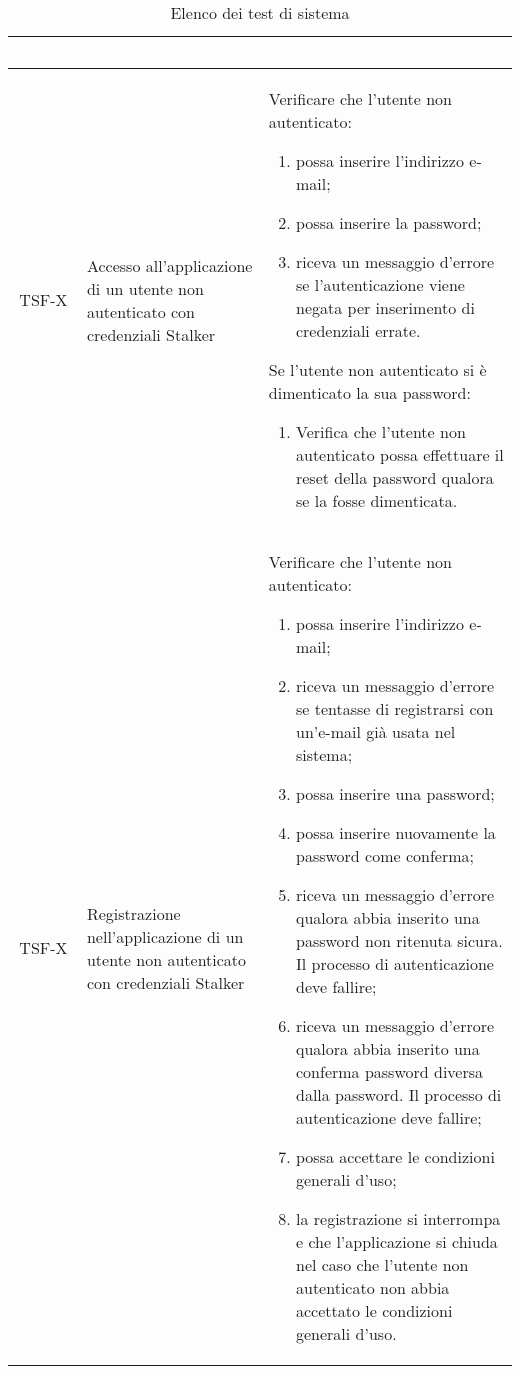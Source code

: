 {
\renewcommand{\arraystretch}{1.5}
\centering
\begin{longtable}{ c | C{3cm} | C{11cm} }
\caption{Elenco dei test di sistema}\\
\textcolor{white}{\textbf{Codice}} & \textcolor{white}{\textbf{Titolo}} & \textcolor{white}{\textbf{Descrizione}} \\
\hline
\endhead


TSF-X & Accesso all'applicazione di un utente non autenticato con credenziali Stalker &
Verificare che l'utente non autenticato:
\begin{enumerate}
    \item possa inserire l'indirizzo e-mail;
    \item possa inserire la password;
    \item riceva un messaggio d'errore se l'autenticazione viene negata per inserimento di credenziali errate.
\end{enumerate}
Se l'utente non autenticato si è dimenticato la sua password:
\begin{enumerate}
    \item Verifica che l'utente non autenticato possa effettuare il reset della password qualora se la fosse dimenticata.
\end{enumerate} \\

TSF-X & Registrazione nell'applicazione di un utente non autenticato con credenziali Stalker &
Verificare che l'utente non autenticato:
\begin{enumerate}
    \item possa inserire l'indirizzo e-mail;
    \item riceva un messaggio d'errore se tentasse di registrarsi con un'e-mail già usata nel sistema;
    \item possa inserire una password;
    \item possa inserire nuovamente la password come conferma;
    \item riceva un messaggio d'errore qualora abbia inserito una password non ritenuta sicura. Il processo di autenticazione deve fallire;
    \item riceva un messaggio d'errore qualora abbia inserito una conferma password diversa dalla password. Il processo di autenticazione deve fallire;
    \item possa accettare le condizioni generali d'uso;
    \item la registrazione si interrompa e che l'applicazione si chiuda nel caso che l'utente non autenticato non abbia accettato le condizioni generali d'uso.
\end{enumerate} \\


\end{longtable}}

